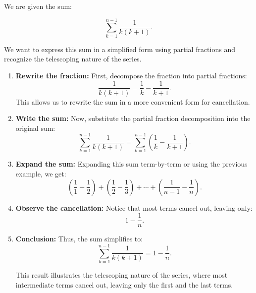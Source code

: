    \begin{example}
        We are given the sum:

        \[
        \sum_{k=1}^{n-1} \frac{1}{k(k+1)}.
        \]

        We want to express this sum in a simplified form using partial fractions and recognize the telescoping nature of the series.

        \begin{enumerate}
            \item \textbf{Rewrite the fraction:} First, decompose the fraction into partial fractions:
            \[
            \frac{1}{k(k+1)} = \frac{1}{k} - \frac{1}{k+1}.
            \]
            This allows us to rewrite the sum in a more convenient form for cancellation.

            \item \textbf{Write the sum:} Now, substitute the partial fraction decomposition into the original sum:
            \[
            \sum_{k=1}^{n-1} \frac{1}{k(k+1)} = \sum_{k=1}^{n-1} \left( \frac{1}{k} - \frac{1}{k+1} \right).
            \]

            \item \textbf{Expand the sum:} Expanding this sum term-by-term or using the previous example, we get:
            \[
            \left( \frac{1}{1} - \frac{1}{2} \right) + \left( \frac{1}{2} - \frac{1}{3} \right) + \cdots + \left( \frac{1}{n-1} - \frac{1}{n} \right).
            \]

            \item \textbf{Observe the cancellation:} Notice that most terms cancel out, leaving only:
            \[
            1 - \frac{1}{n}.
            \]

            \item \textbf{Conclusion:} Thus, the sum simplifies to:
            \[
            \sum_{k=1}^{n-1} \frac{1}{k(k+1)} = 1 - \frac{1}{n}.
            \]

            This result illustrates the telescoping nature of the series, where most intermediate terms cancel out, leaving only the first and the last terms.
        \end{enumerate}
    \end{example}